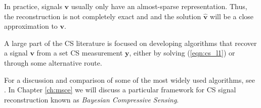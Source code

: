 In practice, signals $\bm v$ usually only have an almost-sparse representation.
Thus, the reconstruction is not completely exact and and the solution $\bm{\hat v}$ will be a close approximation to $\bm v$.

A large part of the CS literature is focused on developing algorithms that recover a signal $\bm v$ from a set CS measurement $\bm y$, either by solving (\ref{eqn:cs_l1}) or through some alternative route.

For a discussion and comparison of some of the most widely used algorithms, see \cite{pilikos2014}.
In Chapter \ref{ch:msce} we will discuss a particular framework for CS signal reconstruction known as \emph{Bayesian Compressive Sensing}.


